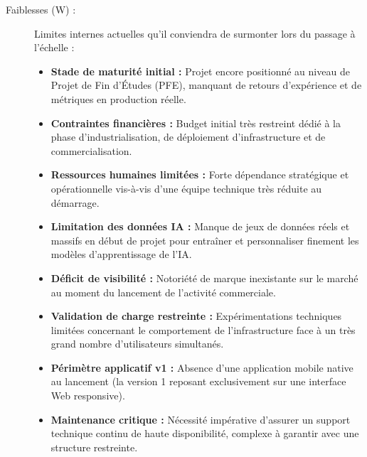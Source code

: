 \documentclass[12pt,a4paper,oneside]{report}
\begin{document}
\begin{description}
    \item[Faiblesses (W) :] Limites internes actuelles qu'il conviendra de surmonter lors du passage à l'échelle :
    \begin{itemize}
        \item \textbf{Stade de maturité initial :} Projet encore positionné au niveau de Projet de Fin d'Études (PFE), manquant de retours d'expérience et de métriques en production réelle.
        \item \textbf{Contraintes financières :} Budget initial très restreint dédié à la phase d'industrialisation, de déploiement d'infrastructure et de commercialisation.
        \item \textbf{Ressources humaines limitées :} Forte dépendance stratégique et opérationnelle vis-à-vis d'une équipe technique très réduite au démarrage.
        \item \textbf{Limitation des données IA :} Manque de jeux de données réels et massifs en début de projet pour entraîner et personnaliser finement les modèles d'apprentissage de l'IA.
        \item \textbf{Déficit de visibilité :} Notoriété de marque inexistante sur le marché au moment du lancement de l'activité commerciale.
        \item \textbf{Validation de charge restreinte :} Expérimentations techniques limitées concernant le comportement de l'infrastructure face à un très grand nombre d'utilisateurs simultanés.
        \item \textbf{Périmètre applicatif v1 :} Absence d'une application mobile native au lancement (la version 1 reposant exclusivement sur une interface Web responsive).
        \item \textbf{Maintenance critique :} Nécessité impérative d'assurer un support technique continu de haute disponibilité, complexe à garantir avec une structure restreinte.
    \end{itemize}


\end{description}
\end{document}
